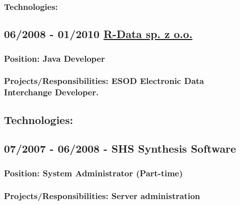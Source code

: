 \documentclass[a4paper]{article}
\begin{document}
\subsubsection* {Technologies:}



\subsection*{06/2008 - 01/2010 \href{www.r-data.pl}{R-Data sp. z o.o.}}

\subsubsection*{Position:  \textcolor[RGB]{140,140,140} {Java Developer}}

\subsubsection*{Projects/Responsibilities: ESOD Electronic Data Interchange Developer.}


\subsection*{Technologies:}

\subsection*{07/2007 - 06/2008 - SHS Synthesis Software}


\subsubsection*{Position:  \textcolor[RGB]{140,140,140} {System Administrator (Part-time)}}


\subsubsection*{Projects/Responsibilities: Server administration}
\end{document}
